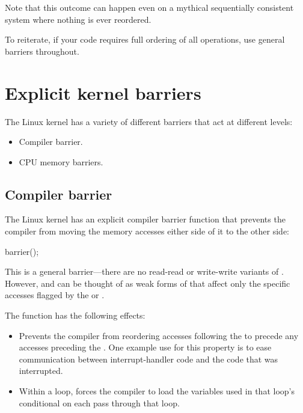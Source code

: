 Note that this outcome can happen even on a mythical sequentially
consistent system where nothing is ever reordered.

To reiterate, if your code requires full ordering of all operations,
use general barriers throughout.


\section{Explicit kernel barriers}

The Linux kernel has a variety of different barriers that act at different
levels:

\begin{itemize}[itemsep=0pt]
 \item Compiler barrier.
 \item CPU memory barriers.
\end{itemize}


\subsection{Compiler barrier}
\label{sec:Compiler barrier}

The Linux kernel has an explicit compiler barrier function that prevents the
compiler from moving the memory accesses either side of it to the other side:

\begin{VerbatimU}
	barrier();
\end{VerbatimU}

This is a general barrier---there are no read-read or write-write
variants of .
However,  and  can be thought of as
weak forms of  that affect only the specific accesses
flagged by the  or .

The  function has the following effects:

\begin{itemize}
 \item
     Prevents the compiler from reordering accesses following the
      to precede any accesses preceding the .
     One example use for this property is to ease communication between
     interrupt-handler code and the code that was interrupted.

 \item
     Within a loop, forces the compiler to load the variables used
     in that loop's conditional on each pass through that loop.
\end{itemize}

